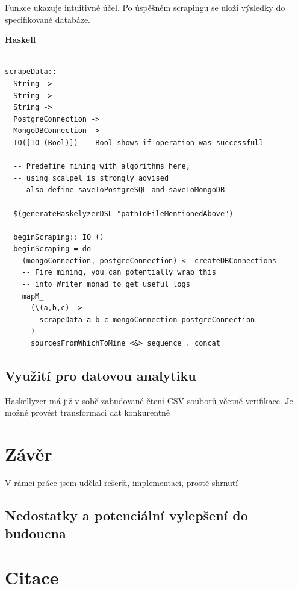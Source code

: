 \documentclass[male,czech]{kithesis}
\begin{document}
Funkce ukazuje intuitivně účel. 
Po úspěšném scrapingu se uloží výsledky do specifikované databáze.

\textbf{Haskell}
\begin{verbatim}

scrapeData:: 
  String -> 
  String -> 
  String -> 
  PostgreConnection -> 
  MongoDBConnection -> 
  IO([IO (Bool)]) -- Bool shows if operation was successfull

  -- Predefine mining with algorithms here, 
  -- using scalpel is strongly advised
  -- also define saveToPostgreSQL and saveToMongoDB

  $(generateHaskelyzerDSL "pathToFileMentionedAbove")

  beginScraping:: IO ()
  beginScraping = do
    (mongoConnection, postgreConnection) <- createDBConnections
    -- Fire mining, you can potentially wrap this 
    -- into Writer monad to get useful logs
    mapM_ 
      (\(a,b,c) -> 
        scrapeData a b c mongoConnection postgreConnection
      ) 
      sourcesFromWhichToMine <&> sequence . concat
\end{verbatim}

\section{Využití pro datovou analytiku}

Haskellyzer má již v sobě zabudované čtení CSV souborů včetně verifikace. Je možné provést 
transformaci dat konkurentně 

\chapter{Závěr}

V rámci práce jsem udělal rešerši, implementaci, prostě shrnutí

\section{Nedostatky a potenciální vylepšení do budoucna}

\chapter{Citace}


\printbibliography[heading=none]
\appendix
\end{document}
